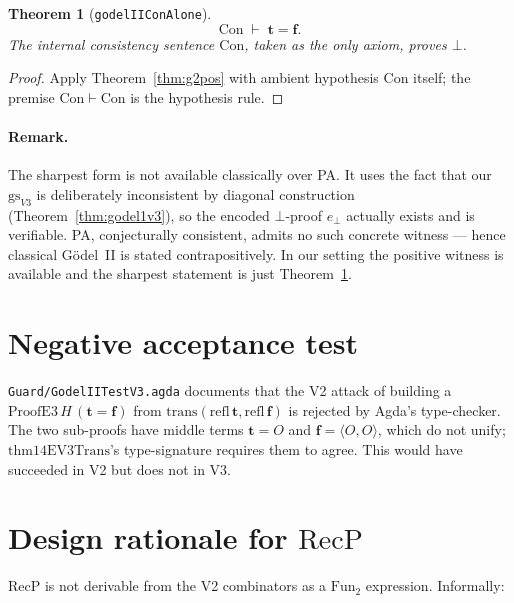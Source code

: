 \documentclass[11pt]{article}
\newtheorem{theorem}{Theorem}
\newcommand{\pair}[2]{\langle #1, #2 \rangle}
\newcommand{\trueT}{\mathbf{t}}
\newcommand{\falseT}{\mathbf{f}}
\newcommand{\RecP}{\mathrm{RecP}}
\begin{document}
\begin{theorem}[\texttt{godelIIConAlone}]
\label{thm:g2sharp}
\[
  \mathrm{Con} \;\vdash\; \trueT = \falseT.
\]
The internal consistency sentence $\mathrm{Con}$, taken as the only
axiom, proves $\bot$.
\end{theorem}

\begin{proof}
Apply Theorem~\ref{thm:g2pos} with ambient hypothesis
$\mathrm{Con}$ itself; the premise $\mathrm{Con} \vdash \mathrm{Con}$ is
the hypothesis rule.
\end{proof}

\paragraph{Remark.}
The sharpest form is not available classically over PA.  It uses
the fact that our $\mathrm{gs}_{V3}$ is deliberately inconsistent
by diagonal construction (Theorem~\ref{thm:godel1v3}), so the
encoded $\bot$-proof $e_\bot$ actually exists and is verifiable.
PA, conjecturally consistent, admits no such concrete witness ---
hence classical G\"odel~II is stated contrapositively.  In our
setting the positive witness is available and the sharpest
statement is just Theorem~\ref{thm:g2sharp}.

\section{Negative acceptance test}

\verb|Guard/GodelIITestV3.agda| documents that the V2 attack of
building a $\mathrm{ProofE3}\,H\,(\trueT = \falseT)$ from
$\mathrm{trans}(\mathrm{refl}\,\trueT, \mathrm{refl}\,\falseT)$ is
rejected by Agda's type-checker.  The two sub-proofs have middle
terms $\trueT = O$ and $\falseT = \pair{O}{O}$, which do not unify;
$\mathrm{thm14EV3Trans}$'s type-signature requires them to agree.
This would have succeeded in V2 but does not in V3.

\appendix

\section{Design rationale for $\RecP$}
\label{sec:recp-explained}

$\RecP$ is not derivable from the V2 combinators as a $\mathrm{Fun}_2$
expression.  Informally:
\end{document}
